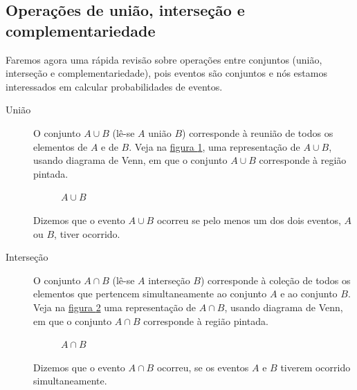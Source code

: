 \subsection{Operações de união, interseção e complementariedade}

Faremos agora uma rápida revisão sobre operações entre conjuntos (união, interseção e complementariedade), pois eventos são conjuntos e nós estamos interessados em calcular probabilidades de eventos.

\begin{description}
  \item[{União}] O conjunto \(A\cup B\) (lê-se \(A\)  união \(B\)) corresponde à reunião de todos os elementos de \(A\) e de \(B\). Veja na \hyperref[aub]{figura \ref{aub}}, uma representação de \(A\cup B\), usando diagrama de Venn, em que o conjunto \(A\cup B\) corresponde à região pintada.

\begin{figure}[H]
\centering

\caption{\(A\cup B\)}
\label{aub}
\end{figure}


Dizemos que o evento \(A\cup B\) ocorreu se pelo menos um dos dois eventos, \(A\) ou \(B\), tiver ocorrido.
\end{description}
\begin{description}
\item [{Interseção}] 
O conjunto \(A\cap B\) (lê-se \(A\) interseção \(B\)) corresponde à coleção de todos os elementos que pertencem simultaneamente ao conjunto \(A\) e ao conjunto \(B\). Veja na \hyperref[intersecao]{figura \ref{intersecao}} uma representação de \(A\cap B\), usando diagrama de Venn, em que o conjunto \(A\cap B\) corresponde à região pintada.
\begin{figure}[H]
\centering

\caption{\(A\cap B\)}
\label{intersecao}
\end{figure}


Dizemos que o evento \(A \cap B\) ocorreu, se os eventos \(A\) e \(B\) tiverem ocorrido simultaneamente.
\end{description}
